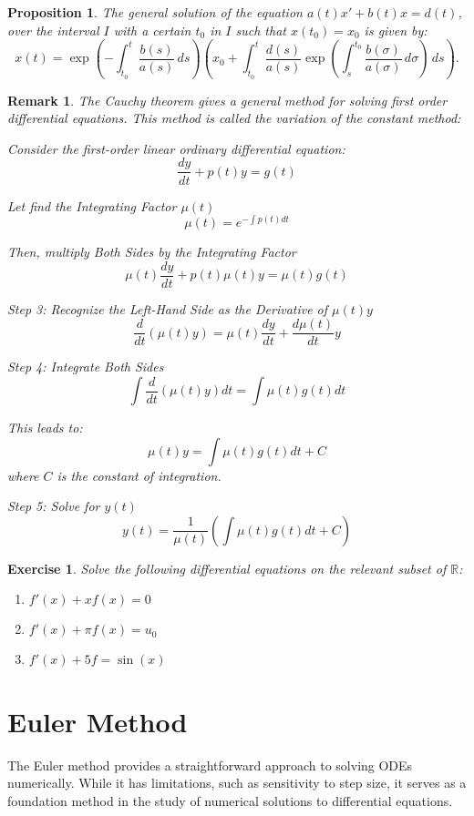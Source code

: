 \documentclass[french,12pt,a4paper]{book}
\newcommand{\R}{\mathbb{R}}
\newtheorem{exo}{Exercise}[chapter]
\newtheorem{prop}{Proposition}[chapter]
\newtheorem{rem}{Remark}[chapter]
\numberwithin{equation}{chapter}
\begin{document}
\begin{prop}
The general solution of the equation $a(t)x' + b(t)x = d(t)$,
over the interval \(I\) with a certain \(t_0\) in \(I\) such that \(x(t_0) = x_0\) is given by:
\[x(t) = \exp \left( - \int_{t_0}^{t} \frac{b(s)}{a(s)} \, ds \right) \left( x_0 + \int_{t_0}^{t} \frac{d(s)}{a(s)} \exp \left( \int_{s}^{t_0} \frac{b(\sigma)}{a(\sigma)} \, d\sigma \right) \, ds \right).\]
\end{prop}


\begin{rem}
The Cauchy theorem gives a general method for solving first order differential equations. This method is called the variation of the constant method:


Consider the first-order linear ordinary differential equation:
\[ \frac{dy}{dt} + p(t)y = g(t) \]

Let find the Integrating Factor \( \mu(t) \)
\[ \mu(t) = e^{- \int p(t) dt} \]

Then, multiply Both Sides by the Integrating Factor
\[ \mu(t) \frac{dy}{dt} + p(t)\mu(t)y = \mu(t)g(t) \]

Step 3: Recognize the Left-Hand Side as the Derivative of \( \mu(t)y \)
\[ \frac{d}{dt}(\mu(t)y) = \mu(t)\frac{dy}{dt} + \frac{d\mu(t)}{dt}y \]

Step 4: Integrate Both Sides
\[ \int \frac{d}{dt}(\mu(t)y) dt = \int \mu(t)g(t) dt \]

This leads to:
\[ \mu(t)y = \int \mu(t)g(t) dt + C \]
where \( C \) is the constant of integration.

Step 5: Solve for \( y(t) \)
\[ y(t) = \frac{1}{\mu(t)} \left( \int \mu(t)g(t) dt + C \right) \]
\end{rem}

\begin{exo}
Solve the following differential equations on the relevant subset of $\R$:
\begin{enumerate}
\item $f'(x) + xf(x) = 0$
\item $f'(x) + \pi f(x) = u_0$
\item $f'(x) + 5f = \sin(x)$
\end{enumerate}
\end{exo}


\section{Euler Method}

The Euler method provides a straightforward approach to solving ODEs numerically. While it has limitations, such as sensitivity to step size, it serves as a foundation method in the study of numerical solutions to differential equations.
\end{document}
